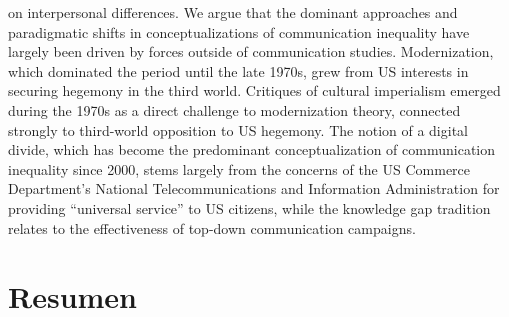 \documentclass{tufte-handout}
\begin{document}
\noindent on interpersonal differences. We argue that the dominant
approaches and paradigmatic shifts in conceptualizations of
communication inequality have largely been driven by forces outside of
communication studies. Modernization, which dominated the period until
the late 1970s, grew from US interests in securing hegemony in the third
world. Critiques of cultural imperialism emerged during the 1970s as a
direct challenge to modernization theory, connected strongly to
third-world opposition to US hegemony. The notion of a digital divide,
which has become the predominant conceptualization of communication
inequality since 2000, stems largely from the concerns of the US
Commerce Department's National Telecommunications and Information
Administration for providing ``universal service'' to US citizens, while
the knowledge gap tradition relates to the effectiveness of top-down
communication campaigns.

\hypertarget{resumen}{%
\section{Resumen}\label{resumen}}
\end{document}
